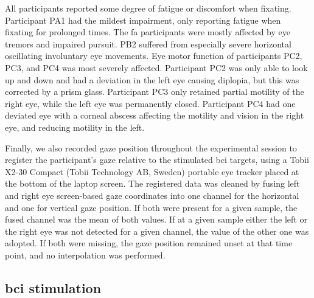 \documentclass[twocolumn]{article}
\begin{document}
All participants reported some degree of fatigue or discomfort when fixating.
Participant PA1 had the mildest impairment, only reporting fatigue when fixating
for prolonged times.
The \ac{fa} participants were mostly affected by eye tremors and impaired pursuit.
PB2 suffered from especially severe horizontal oscillating involuntary eye
movements.
Eye motor function of participants PC2, PC3, and PC4 was most severely affected.
Participant PC2 was only able to look up and down and had a deviation in the
left eye causing diplopia, but this was corrected by a prism glass.
Participant PC3 only retained partial motility of the right eye, while the left eye was permanently closed.
Participant PC4 had one deviated eye with a corneal abscess affecting the motility
and vision in the right eye, and reducing motility in the left.

Finally, we also recorded gaze position throughout the experimental session to
register the participant's gaze relative to the stimulated \ac{bci} targets,
using a Tobii X2-30 Compact (Tobii
Technology AB, Sweden) portable eye tracker placed at the bottom of the laptop screen.
The registered data was cleaned by fusing left and right eye screen-based gaze
coordinates into one channel for the horizontal and one for vertical gaze position.
If both were present for a given sample, the fused channel was the mean of both
values.
If at a given sample either the left or the right eye was not detected for a
given channel, the value of the other one was adopted.
If both were missing, the gaze position remained unset at that time point, and no
interpolation was performed.



\subsection{\Acs{bci} stimulation}
\end{document}
